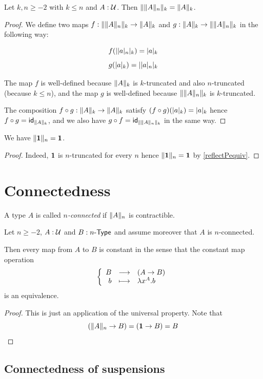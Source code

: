 \begin{lem}
  Let $k,n\ge-2$ with $k\le{}n$ and $A:\type$. Then
  $\trunc k{\trunc nA}=\trunc kA$.
\end{lem}
\begin{proof}
  We define two maps $f:\trunc k{\trunc nA}\to\trunc kA$ and
  $g:\trunc kA\to\trunc k{\trunc nA}$ in the following way:

  \[f(\tproj k{\tproj na})=\tproj ka\]
  \[g(\tproj ka)=\tproj k{\tproj na}\]

  The map $f$ is well-defined because $\trunc kA$ is $k$-truncated and also
  $n$-truncated (because $k\le{}n$), and the map $g$ is well-defined because
  $\trunc k{\trunc nA}$ is $k$-truncated.

  The composition $f\circ{}g:\trunc kA\to\trunc kA$ satisfy
  $(f\circ{}g)(\tproj ka)=\tproj ka$ hence $f\circ{}g=\idfunc[\trunc kA]$, and
  we also have $g\circ{}f=\idfunc[\trunc k{\trunc nA}]$ in the same way.
\end{proof}

\begin{lem}
  We have $\trunc n{\unit}=\unit$.
\end{lem}
\begin{proof}
  Indeed, $\unit$ is $n$-truncated for every $n$ hence $\trunc n{\unit}=\unit$ by
  \autoref{reflectPequiv}.
\end{proof}

\section{Connectedness}

\begin{defn}
  A type $A$ is called \emph{$n$-connected} if $\trunc nA$ is contractible.
\end{defn}

\begin{lem}
  \label{connectedtotruncated}
  Let $n\ge-2$, $A:\type$ and $B:\typele{n}$ and assume moreover that $A$ is
  $n$-connected.

  Then every map from $A$ to $B$ is constant in the sense that the constant map
  operation
  \[\function{B}{(A\to{}B)}{b}{\lambda{}x^A.b}\]
  is an equivalence.
\end{lem}
\begin{proof}
  This is just an application of the universal property. Note that
  \[(\trunc nA\to{}B)=(\unit\to{}B)=B \qedhere\]
\end{proof}

\subsection{Connectedness of suspensions}

